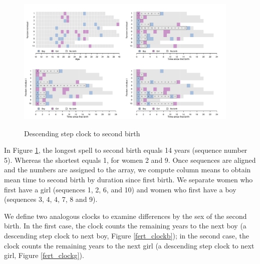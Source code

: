 \documentclass[a4paper,left=1.25cm,right=1.25cm,top=1.25cm,bottom=1.25cm]{article}
\begin{document}
\begin{figure}[H]
\centering
    \includegraphics[trim=17cm 10cm 1cm 1cm, clip, width=0.95\textwidth]{Figures/colombia/illu_fertility.pdf}\\
    \caption{Descending step clock to second birth}
    \label{fert_aling}
\end{figure}

In Figure \ref{fert_aling}, the longest spell to second birth equals 14 years (sequence number 5). Whereas the shortest equals 1, for women 2 and 9. Once sequences are aligned and the numbers are assigned to the array, we compute column means to obtain mean time to second birth by duration since first birth. We separate women who first have a girl (sequences 1, 2, 6, and 10) and women who first have a boy (sequences 3, 4, 4, 7, 8 and 9).

We define two analogous clocks to examine differences by the sex of the second birth. In the first case, the clock counts the remaining years to the next boy (a descending step clock to next boy, Figure \ref{fert_clockb}); in the second case, the clock counts the remaining years to the next girl (a descending step clock to next girl, Figure \ref{fert_clockg}). 
\end{document}
